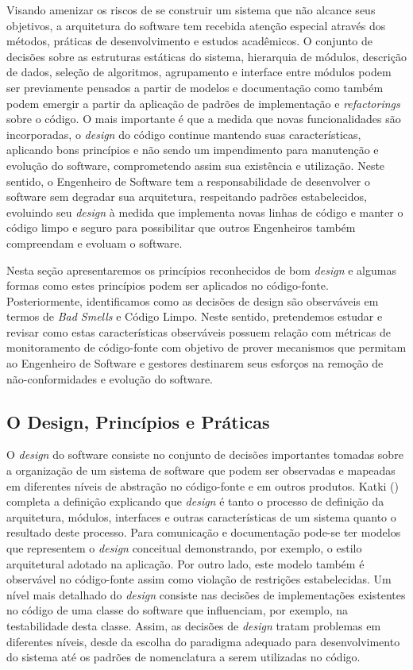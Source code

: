 Visando amenizar os riscos de se construir um sistema que não alcance seus objetivos, a arquitetura do software tem recebida atenção especial através dos métodos, práticas de desenvolvimento e estudos acadêmicos. O conjunto de decisões sobre as estruturas estáticas do sistema, hierarquia de módulos, descrição de dados, seleção de algoritmos, agrupamento e interface entre módulos podem ser previamente pensados a partir de modelos e documentação como também podem emergir a partir da aplicação de padrões de implementação e \emph{refactorings} sobre o código. O mais importante é que a medida que novas funcionalidades são incorporadas, o \emph{design} do código continue mantendo suas características, aplicando bons princípios e não sendo um impendimento para manutenção e evolução do software, comprometendo assim sua existência e utilização. Neste sentido, o Engenheiro de Software tem a responsabilidade de desenvolver o software sem degradar sua arquitetura, respeitando padrões estabelecidos, evoluindo seu \emph{design} à medida que implementa novas linhas de código e manter o código limpo e seguro para possibilitar que outros Engenheiros também compreendam e evoluam o software.

%

Nesta seção apresentaremos os princípios reconhecidos de bom \emph{design} e algumas formas como estes princípios podem ser aplicados no código-fonte. Posteriormente, identificamos como as decisões de design são observáveis em termos de \emph{Bad Smells} e Código Limpo. Neste sentido, pretendemos estudar e revisar como estas características observáveis possuem relação com métricas de monitoramento de código-fonte com objetivo de prover mecanismos que permitam ao Engenheiro de Software e gestores destinarem seus esforços na remoção de não-conformidades e evolução do software.

%

\subsection{O Design, Princípios e Práticas}
\label{sec-principles-practises}

O \emph{design} do software consiste no conjunto de decisões importantes tomadas sobre a organização de um sistema de software que podem ser observadas e mapeadas em diferentes níveis de abstração no código-fonte e em outros produtos. Katki (\citeyear{katki1991}) completa a definição explicando que \emph{design} é tanto o processo de definição da arquitetura, módulos, interfaces e outras características de um sistema quanto o resultado deste processo. Para comunicação e documentação pode-se ter modelos que representem o \emph{design} conceitual demonstrando, por exemplo, o estilo arquitetural adotado na aplicação. Por outro lado, este modelo também é observável no código-fonte assim como violação de restrições estabelecidas. Um nível mais detalhado do \emph{design} consiste nas decisões de implementações existentes no código de uma classe do software que influenciam, por exemplo, na testabilidade desta classe. Assim, as decisões de \emph{design} tratam problemas em diferentes níveis, desde da escolha do paradigma adequado para desenvolvimento do sistema até os padrões de nomenclatura a serem utilizadas no código. 


